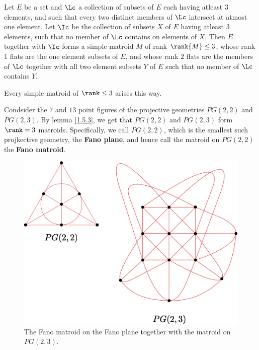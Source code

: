 \begin{lemma}\label{1.5.3}
    Let $E$ be a set and $\Lc$ a collection of subsets of $E$ each having
    atleast $3$ elements, and such that every two distinct members of $\Lc$
    intersect at atmost one element. Let  $\Ic$ be the collection of subsets $X$
    of  $E$ having atleast  $3$ elements, such that no member of  $\Lc$ contains
    on elements of  $X$. Then $E$ together with $\Ic$ forms a simple matroid $M$
    of rank  $\rank{M} \leq 3$, whose rank $1$ flats are the one element subsets
    of  $E$, and whose rank $2$ flats are the members of $\Lc$ together with all
    two element subsets $Y$ of $E$ such that no member of $\Lc$ contains $Y$.
\end{lemma}
\begin{corollary}
    Every simple matroid of $\rank \leq 3$ arises this way.
\end{corollary}

\begin{example}\label{1.19}
    Condsider the $7$ and  $13$ point figures of the projective geometries
    $PG(2,2)$ and $PG(2,3)$. By lemma \ref{1.5.3}, we get that $PG(2,2)$ and
    $PG(2,3)$ form $\rank=3$  matroids. Specifically, we call $PG(2,2)$, which is
    the smallest such projkective geometry, the \textbf{Fano plane}, and hence
    call the matroid on $PG(2,2)$ the \textbf{Fano matroid}.
    \begin{figure}[h]
        \centering
        \includegraphics[scale=0.7]{Figures/Chapter1/pg(2,2)_pg(2,3).eps}
        \caption{The Fano matroid on the Fano plane together with the matroid on
        $PG(2,3)$.}
        \label{fig_1.14}
    \end{figure}
\end{example}

